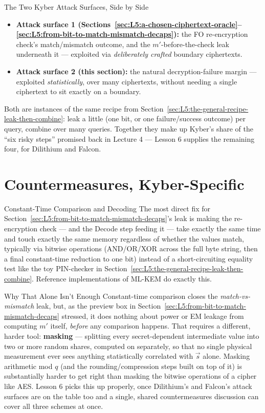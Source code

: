 \begin{rmkbox}{The Two Kyber Attack Surfaces, Side by Side}
\begin{itemize}[leftmargin=*]
  \item \textbf{Attack surface 1 (Sections~\ref{sec:L5:a-chosen-ciphertext-oracle}--\ref{sec:L5:from-bit-to-match-mismatch-decaps}):} the FO re-encryption check's match/mismatch outcome, and the $m'$-before-the-check leak underneath it --- exploited via \emph{deliberately crafted} boundary ciphertexts.
  \item \textbf{Attack surface 2 (this section):} the natural decryption-failure margin --- exploited \emph{statistically}, over many ciphertexts, without needing a single ciphertext to sit exactly on a boundary.
\end{itemize}
Both are instances of the same recipe from Section~\ref{sec:L5:the-general-recipe-leak-then-combine}: leak a little (one bit, or one failure/success outcome) per query, combine over many queries. Together they make up Kyber's share of the ``six risky steps'' promised back in Lecture 4 --- Lesson 6 supplies the remaining four, for Dilithium and Falcon.
\end{rmkbox}

\section{Countermeasures, Kyber-Specific}
\label{sec:L5:kyber-specific-countermeasures}

\begin{rmkbox}{Constant-Time Comparison and Decoding}
The most direct fix for Section~\ref{sec:L5:from-bit-to-match-mismatch-decaps}'s leak is making the re-encryption check --- and the Decode step feeding it --- take exactly the same time and touch exactly the same memory regardless of whether the values match, typically via bitwise operations (AND/OR/XOR across the full byte string, then a final constant-time reduction to one bit) instead of a short-circuiting equality test like the toy PIN-checker in Section~\ref{sec:L5:the-general-recipe-leak-then-combine}. Reference implementations of ML-KEM do exactly this.
\end{rmkbox}

\begin{rmkbox}{Why That Alone Isn't Enough}
Constant-time comparison closes the \emph{match-vs-mismatch} leak, but, as the preview box in Section~\ref{sec:L5:from-bit-to-match-mismatch-decaps} stressed, it does nothing about power or EM leakage from computing $m'$ itself, \emph{before} any comparison happens. That requires a different, harder tool: \textbf{masking} --- splitting every secret-dependent intermediate value into two or more random shares, computed on separately, so that no single physical measurement ever sees anything statistically correlated with $\vec s$ alone. Masking arithmetic mod $q$ (and the rounding/compression steps built on top of it) is substantially harder to get right than masking the bitwise operations of a cipher like AES. Lesson 6 picks this up properly, once Dilithium's and Falcon's attack surfaces are on the table too and a single, shared countermeasures discussion can cover all three schemes at once.
\end{rmkbox}

